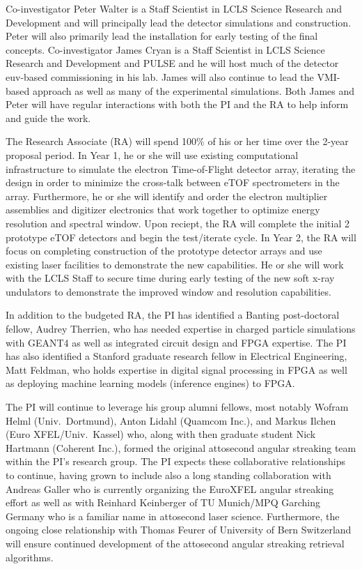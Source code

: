 Co-investigator Peter Walter is a Staff Scientist in LCLS Science Research and Development and will principally lead the detector simulations and construction.
Peter will also primarily lead the installation for early testing of the final concepts.
Co-investigator James Cryan is a Staff Scientist in LCLS Science Research and Development and PULSE and he will host much of the detector euv-based commissioning in his lab.
James will also continue to lead the VMI-based approach as well as many of the experimental simulations.
Both James and Peter will have regular interactions with both the PI and the RA to help inform and guide the work.

The Research Associate (RA) will spend 100\% of his or her time over the 2-year proposal period.  
In Year 1, he or she will use existing computational infrastructure to simulate the electron Time-of-Flight detector array, iterating the design in order to minimize the cross-talk between eTOF spectrometers in the array.  
Furthermore, he or she will identify and order the electron multiplier assemblies and digitizer electronics that work together to optimize energy resolution and spectral window.  
Upon reciept, the RA will complete the initial 2 prototype eTOF detectors and begin the test/iterate cycle.
In Year 2, the RA will focus on completing construction of the prototype detector arrays and use existing laser facilities to demonstrate the new capabilities.  
He or she will work with the LCLS Staff to secure time during early testing of the new soft x-ray undulators to demonstrate the improved window and resolution capabilities.

In addition to the budgeted RA, the PI has identified a Banting post-doctoral fellow, Audrey Therrien, who has needed expertise in charged particle simulations with GEANT4 as well as integrated circuit design and FPGA expertise.
The PI has also identified a Stanford graduate research fellow in Electrical Engineering, Matt Feldman, who holds expertise in digital signal processing in FPGA as well as deploying machine learning models (inference engines) to FPGA.

The PI will continue to leverage his group alumni fellows, most notably Wofram Helml (Univ.~Dortmund), Anton Lidahl (Quamcom Inc.), and Markus Ilchen (Euro XFEL/Univ.~Kassel) who, along with then graduate student Nick Hartmann (Coherent Inc.), formed the original attosecond angular streaking team within the PI's research group.
The PI expects these collaborative relationships to continue, having grown to include also a long standing collaboration with Andreas Galler who is currently organizing the EuroXFEL angular streaking effort as well as with Reinhard Keinberger of TU Munich/MPQ Garching Germany who is a familiar name in attosecond laser science.
Furthermore, the ongoing close relationship with Thomas Feurer of University of Bern Switzerland will ensure continued development of the attosecond angular streaking retrieval algorithms.

